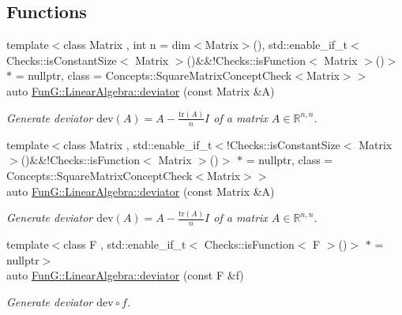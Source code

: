 \subsection*{\-Functions}
\begin{DoxyCompactItemize}
\item 
{\footnotesize template$<$class Matrix , int n = dim$<$\-Matrix$>$(), std\-::enable\-\_\-if\-\_\-t$<$ Checks\-::is\-Constant\-Size$<$ Matrix $>$()\&\&!\-Checks\-::is\-Function$<$ Matrix $>$()$>$ $\ast$  = nullptr, class  = \-Concepts\-::\-Square\-Matrix\-Concept\-Check$<$\-Matrix$>$$>$ }\\auto \hyperlink{group__LinearAlgebraGroup_ga7c0b1db93cfc5779a3b1e7eb1646c213}{\-Fun\-G\-::\-Linear\-Algebra\-::deviator} (const \-Matrix \&\-A)
\begin{DoxyCompactList}\small\item\em \-Generate deviator $ \mathrm{dev}(A) = A - \frac{\mathrm{tr}(A)}{n}I $ of a matrix $ A\in\mathbb{R}^{n,n} $. \end{DoxyCompactList}\item 
{\footnotesize template$<$class Matrix , std\-::enable\-\_\-if\-\_\-t$<$!\-Checks\-::is\-Constant\-Size$<$ Matrix $>$()\&\&!\-Checks\-::is\-Function$<$ Matrix $>$()$>$ $\ast$  = nullptr, class  = \-Concepts\-::\-Square\-Matrix\-Concept\-Check$<$\-Matrix$>$$>$ }\\auto \hyperlink{group__LinearAlgebraGroup_gabc90de0d1754cd2e2d190ea8ba62245f}{\-Fun\-G\-::\-Linear\-Algebra\-::deviator} (const \-Matrix \&\-A)
\begin{DoxyCompactList}\small\item\em \-Generate deviator $ \mathrm{dev}(A) = A - \frac{\mathrm{tr}(A)}{n}I $ of a matrix $ A\in\mathbb{R}^{n,n} $. \end{DoxyCompactList}\item 
{\footnotesize template$<$class F , std\-::enable\-\_\-if\-\_\-t$<$ Checks\-::is\-Function$<$ F $>$()$>$ $\ast$  = nullptr$>$ }\\auto \hyperlink{group__LinearAlgebraGroup_gad363f3add577abc046fc525ce83e22d3}{\-Fun\-G\-::\-Linear\-Algebra\-::deviator} (const \-F \&f)
\begin{DoxyCompactList}\small\item\em \-Generate deviator $ \mathrm{dev}\circ f$. \end{DoxyCompactList}\end{DoxyCompactItemize}

